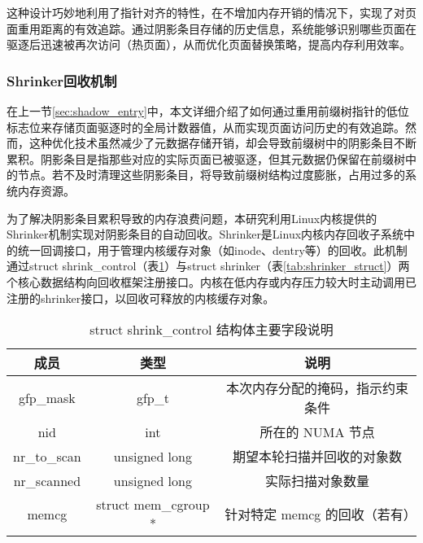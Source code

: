 这种设计巧妙地利用了指针对齐的特性，在不增加内存开销的情况下，实现了对页面重用距离的有效追踪。通过阴影条目存储的历史信息，系统能够识别哪些页面在驱逐后迅速被再次访问（热页面），从而优化页面替换策略，提高内存利用效率。


\subsubsection{Shrinker回收机制}

在上一节\ref{sec:shadow_entry}中，本文详细介绍了如何通过重用前缀树指针的低位标志位来存储页面驱逐时的全局计数器值，从而实现页面访问历史的有效追踪。然而，这种优化技术虽然减少了元数据存储开销，却会导致前缀树中的阴影条目不断累积。阴影条目是指那些对应的实际页面已被驱逐，但其元数据仍保留在前缀树中的节点。若不及时清理这些阴影条目，将导致前缀树结构过度膨胀，占用过多的系统内存资源。

为了解决阴影条目累积导致的内存浪费问题，本研究利用Linux内核提供的Shrinker机制实现对阴影条目的自动回收。Shrinker是Linux内核内存回收子系统中的统一回调接口，用于管理内核缓存对象（如inode、dentry等）的回收。此机制通过struct shrink\_control（表\ref{tab:shrink_control_struct}）与struct shrinker（表\ref{tab:shrinker_struct}）两个核心数据结构向回收框架注册接口。内核在低内存或内存压力较大时主动调用已注册的shrinker接口，以回收可释放的内核缓存对象。

\begin{table}[htbp]
  \centering
  \caption{struct shrink\_control 结构体主要字段说明}
  \label{tab:shrink_control_struct}
  \begin{tabular}{ccc}
    \toprule
    \textbf{成员} & \textbf{类型} & \textbf{说明} \\
    \midrule
    gfp\_mask & gfp\_t & 本次内存分配的掩码，指示约束条件 \\
    nid & int & 所在的 NUMA 节点 \\
    nr\_to\_scan & unsigned long & 期望本轮扫描并回收的对象数 \\
    nr\_scanned & unsigned long & 实际扫描对象数量 \\
    memcg & struct mem\_cgroup * & 针对特定 memcg 的回收（若有） \\
    \bottomrule
  \end{tabular}
\end{table}


